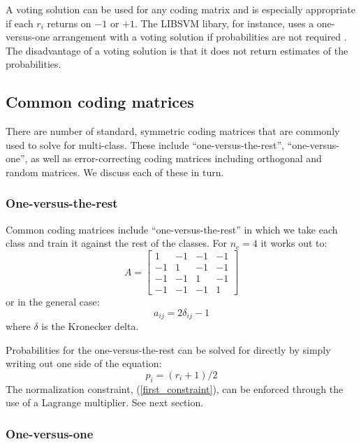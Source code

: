 \documentclass{article}
\begin{document}
A voting solution can be used for any coding matrix and 
is especially appropriate if each $r_i$ returns on $-1$ or $+1$.  
The LIBSVM libary, for instance, uses a one-versus-one arrangement with a voting
solution if probabilities are not required \citep{Chang_Lin2011}.
The disadvantage of a voting solution is
that it does not return estimates of the probabilities.

\subsection{Common coding matrices}

There are number of standard, symmetric coding matrices that are commonly used
to solve for multi-class.
These include ``one-versus-the-rest'', ``one-versus-one'',
as well as error-correcting coding matrices including orthogonal and
random matrices.
We discuss each of these in turn.

\subsubsection{One-versus-the-rest}

Common coding matrices include ``one-versus-the-rest'' in which
we take each class and train it against the rest of the
classes.
For $n_c=4$ it works out to:
\begin{equation}
A = 
\begin{bmatrix}
1 & -1 & -1 & -1 \\
-1 & 1 & -1 & -1 \\
-1 & -1 & 1 & -1 \\
-1 & -1 & -1 & 1
\end{bmatrix}
\end{equation}
or in the general case:
\begin{equation}
	a_{ij}=2 \delta_{ij}-1
\end{equation}
where $\delta$ is the Kronecker delta.

Probabilities for the one-versus-the-rest can be solved for directly by
simply writing out one side of the equation:
\begin{equation}
	p_i = (r_i + 1)/2
\end{equation}
The normalization constraint, (\ref{first_constraint}), can be enforced 
through the use of a Lagrange multiplier. See next section.

\subsubsection{One-versus-one}
\end{document}
